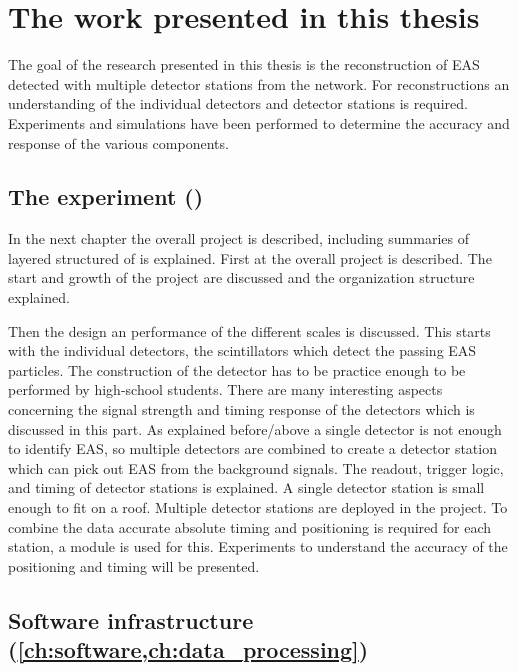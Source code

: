 \section{The work presented in this thesis}

The goal of the research presented in this thesis is the reconstruction of EAS detected with multiple detector stations from the \hisparc network. For reconstructions an understanding of the individual detectors and detector stations is required. Experiments and simulations have been performed to determine the accuracy and response of the various components.


\subsection{The \hisparc experiment
            ()}

In the next chapter the overall project is described, including summaries of layered structured of \hisparc is explained. First at the overall project is described. The start and growth of the project are discussed and the organization structure explained.

Then the design an performance of the different scales is discussed. This starts with the individual detectors, the scintillators which detect the passing EAS particles. The construction of the detector has to be practice enough to be performed by high-school students. There are many interesting aspects concerning the signal strength and timing response of the detectors which is discussed in this part. As explained before/above a single detector is not enough to identify EAS, so multiple detectors are combined to create a detector station which can pick out EAS from the background signals. The readout, trigger logic, and timing of detector stations is explained. A single detector station is small enough to fit on a roof. Multiple detector stations are deployed in the \hisparc project. To combine the data accurate absolute timing and positioning is required for each station, a \gps module is used for this. Experiments to understand the accuracy of the \gps positioning and timing will be presented.


\subsection{Software infrastructure
            (\cref{ch:software,ch:data_processing})}

